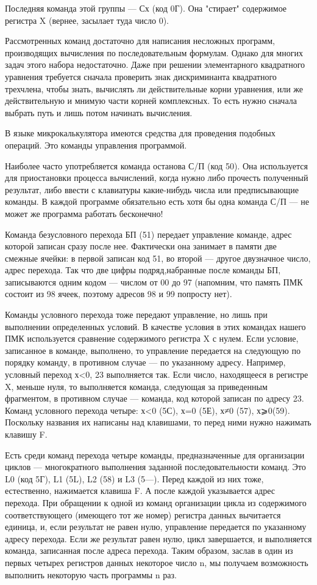 \documentclass[11pt,a4paper,oneside]{article}
\begin{document}
Последняя команда этой группы — Сх (код 0Г). Она "стирает" содержимое регистра X (вернее, засылает туда число 0).

Рассмотренных команд достаточно для написания несложных программ, производящих вычисления по последовательным формулам. Однако для многих задач этого набора недостаточно. Даже при решении элементарного квадратного уравнения требуется сначала проверить знак дискриминанта квадратного трехчлена, чтобы знать, вычислять ли действительные корни уравнения, или же действительную и мнимую части корней комплексных. То есть нужно сначала выбрать путь и лишь потом начинать вычисления.

В языке микрокалькулятора имеются средства для проведения подобных операций. Это команды управления программой.

Наиболее часто употребляется команда останова С/П (код 50). Она используется для приостановки процесса вычислений, когда нужно либо прочесть полученный результат, либо ввести с клавиатуры какие-нибудь числа или предписывающие команды. В каждой программе обязательно есть хотя бы одна команда С/П — не может же программа работать бесконечно!

Команда безусловного перехода БП (51) передает управление команде, адрес которой записан сразу после нее. Фактически она занимает в памяти две смежные ячейки: в первой записан код 51, во второй — другое двузначное число, адрес перехода. Так что две цифры подряд,набранные после команды БП, записываются одним кодом — числом от 00 до 97 (напомним, что память ПМК состоит из 98 ячеек, поэтому адресов 98 и 99 попросту нет).

Команды условного перехода тоже передают управление, но лишь при выполнении определенных условий. В качестве условия в этих командах нашего ПМК используется сравнение содержимого регистра X с нулем. Если условие, записанное в команде, выполнено, то управление передается на следующую по порядку команду, в противном случае — по указанному адресу. Например, условный переход х<0, 23 выполняется так. Если число, находящееся в регистре X, меньше нуля, то выполняется команда, следующая за приведенным фрагментом, в противном случае — команда, код которой записан по адресу 23. Команд условного перехода четыре: х<0 (5С), х=0 (5Е), х≠0 (57), х⩾0(59).
Поскольку названия их написаны над клавишами, то перед ними нужно нажимать клавишу F.

Есть среди команд перехода четыре команды, предназначенные для организации циклов — многократного выполнения заданной последовательности команд. Это L0 (код 5Г), L1 (5L), L2 (58) и L3 (5—). Перед каждой из них тоже, естественно, нажимается клавиша F. А после каждой указывается адрес перехода. При обращении к одной из команд организации цикла из содержимого соответствующего (имеющего тот же номер) регистра данных вычитается единица, и, если результат не равен нулю, управление передается по указанному адресу перехода. Если же результат равен нулю, цикл завершается, и выполняется команда, записанная после адреса перехода. Таким образом, заслав в один из первых четырех регистров данных некоторое число n, мы получаем возможность выполнить некоторую часть программы n раз.
\end{document}
